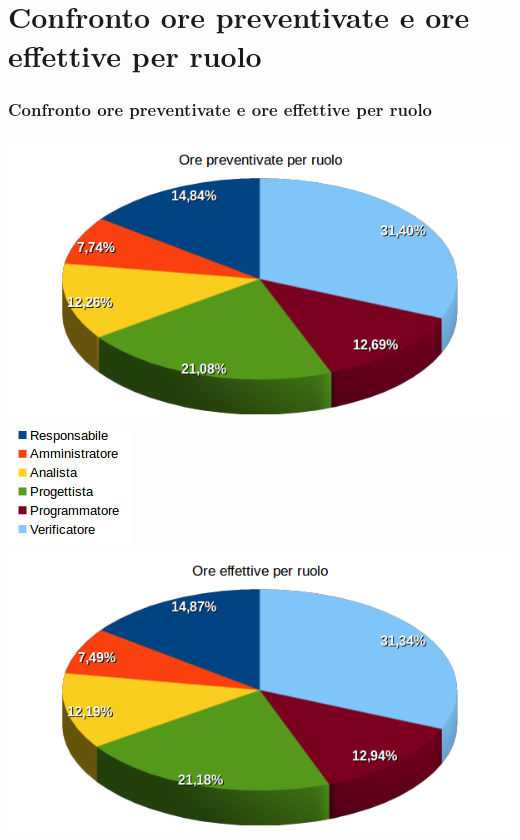 \section{Confronto ore preventivate e ore effettive per ruolo}
\begin{frame}
	\frametitle{Confronto ore preventivate e ore effettive per ruolo}	
\begin{center}
	\includegraphics[scale=0.27]{img/orePREVENTIVATEperruolo.png}
	\qquad
	\includegraphics[scale=0.35]{img/legenda.png}
	\qquad
	\includegraphics[scale=0.27]{img/oreEFFETTIVEperruolo.png}
\end{center}
\end{frame}

